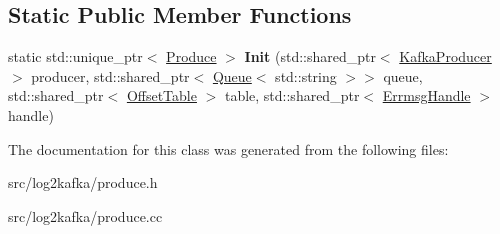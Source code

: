 \subsection*{Static Public Member Functions}
\begin{DoxyCompactItemize}
\item 
static std\+::unique\+\_\+ptr$<$ \hyperlink{classlog2hdfs_1_1Produce}{Produce} $>$ {\bfseries Init} (std\+::shared\+\_\+ptr$<$ \hyperlink{classlog2hdfs_1_1KafkaProducer}{Kafka\+Producer} $>$ producer, std\+::shared\+\_\+ptr$<$ \hyperlink{classlog2hdfs_1_1Queue}{Queue}$<$ std\+::string $>$$>$ queue, std\+::shared\+\_\+ptr$<$ \hyperlink{classlog2hdfs_1_1OffsetTable}{Offset\+Table} $>$ table, std\+::shared\+\_\+ptr$<$ \hyperlink{classlog2hdfs_1_1ErrmsgHandle}{Errmsg\+Handle} $>$ handle)\hypertarget{classlog2hdfs_1_1Produce_aef7023671b57bc08a95236068e3d4245}{}\label{classlog2hdfs_1_1Produce_aef7023671b57bc08a95236068e3d4245}

\end{DoxyCompactItemize}


The documentation for this class was generated from the following files\+:\begin{DoxyCompactItemize}
\item 
src/log2kafka/produce.\+h\item 
src/log2kafka/produce.\+cc\end{DoxyCompactItemize}
